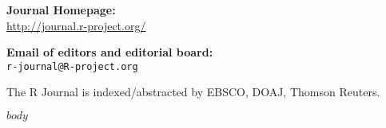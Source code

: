 \documentclass[a4paper,twoside]{report}
\begin{document}
\begin{center}
\begin{minipage}{0.65\textwidth}
\begin{center}
    \bigskip
    \textbf{\R{} Journal Homepage:}\\
    \url{http://journal.r-project.org/}

    \bigskip
    \textbf{Email of editors and editorial board:}\\
    \texttt{r-journal@R-project.org}

    \bigskip The R Journal is indexed/abstracted by EBSCO, DOAJ, Thomson Reuters.

    $body$

  \end{center}

  \end{minipage}
\end{center}

\newpage
\end{document}
